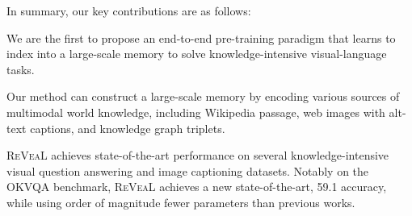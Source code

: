 \documentclass[10pt,twocolumn,letterpaper]{article}
\newcommand{\method}{R\textsc{e}V\textsc{ea}L\xspace}
\begin{document}
In summary, our key contributions are as follows: 
\begin{compactitem}
\item 
We are the first to propose an end-to-end pre-training paradigm that learns to index into a large-scale memory to solve knowledge-intensive visual-language tasks.
\item
Our method can construct a large-scale memory by encoding various sources of multimodal world knowledge, including Wikipedia passage, web images with alt-text captions, and knowledge graph triplets.
\item
\method achieves state-of-the-art performance on several knowledge-intensive visual question answering and image captioning datasets. Notably on the OKVQA benchmark, \method achieves a new state-of-the-art, 59.1 accuracy, while using order of magnitude fewer parameters than previous works.
\end{compactitem}
\end{document}
